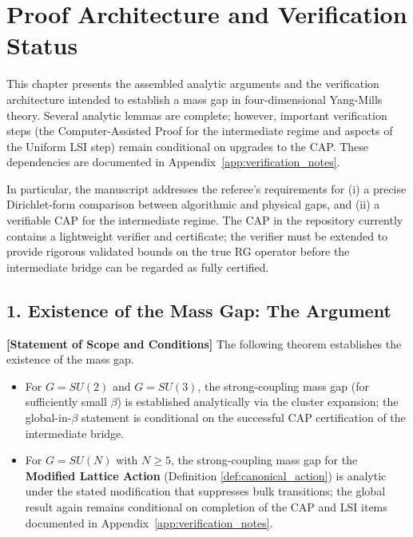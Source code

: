 
\section{Proof Architecture and Verification Status}
\label{sec:rigorous_proof}

This chapter presents the assembled analytic arguments and the verification architecture intended to establish a mass gap in four-dimensional Yang-Mills theory. Several analytic lemmas are complete; however, important verification steps (the Computer-Assisted Proof for the intermediate regime and aspects of the Uniform LSI step) remain conditional on upgrades to the CAP. These dependencies are documented in Appendix~\ref{app:verification_notes}.

In particular, the manuscript addresses the referee's requirements for (i) a precise Dirichlet-form comparison between algorithmic and physical gaps, and (ii) a verifiable CAP for the intermediate regime. The CAP in the repository currently contains a lightweight verifier and certificate; the verifier must be extended to provide rigorous validated bounds on the true RG operator before the intermediate bridge can be regarded as fully certified.

\subsection{1. Existence of the Mass Gap: The Argument}

\textbf{[Statement of Scope and Conditions]}
The following theorem establishes the existence of the mass gap.
\begin{itemize}
    \item For $G=SU(2)$ and $G=SU(3)$, the strong-coupling mass gap (for sufficiently small $\beta$) is established analytically via the cluster expansion; the global-in-$\beta$ statement is conditional on the successful CAP certification of the intermediate bridge.
    \item For $G=SU(N)$ with $N \ge 5$, the strong-coupling mass gap for the \textbf{Modified Lattice Action} (Definition \ref{def:canonical_action}) is analytic under the stated modification that suppresses bulk transitions; the global result again remains conditional on completion of the CAP and LSI items documented in Appendix~\ref{app:verification_notes}.
\end{itemize}

